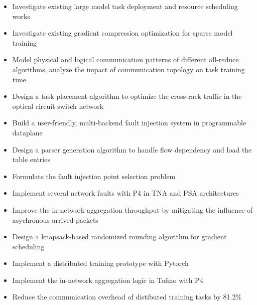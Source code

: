 \documentclass{resume}
\begin{document}
\begin{itemize}
  \item Investigate existing large model task deployment and resource scheduling works
  \item Investigate existing gradient compression optimization for sparse model training
  \item Model physical and logical communication patterns of different all-reduce algorithms, analyze the impact of communication topology on task training time
  \item Design a task placement algorithm to optimize the cross-rack traffic in the optical circuit switch network
\end{itemize}

\begin{itemize}
  \item Build a user-friendly, multi-backend fault injection system in programmable dataplane
  \item Design a parser generation algorithm to handle flow dependency and load the table entries
  \item Formulate the fault injection point selection problem
  \item Implement several network faults with P4 in TNA and PSA architectures
\end{itemize}

\begin{itemize}
  \item Improve the in-network aggregation throughput by mitigating the influence of asychronous arrived packets
  \item Design a knapsack-based randomized rounding algorithm for gradient scheduling
  \item Implement a distributed training prototype with Pytorch 
  \item Implement the in-network aggregation logic in Tofino with P4
  \item Reduce the communication overhead of distibuted training tasks by 81.2\%
\end{itemize}
\end{document}
